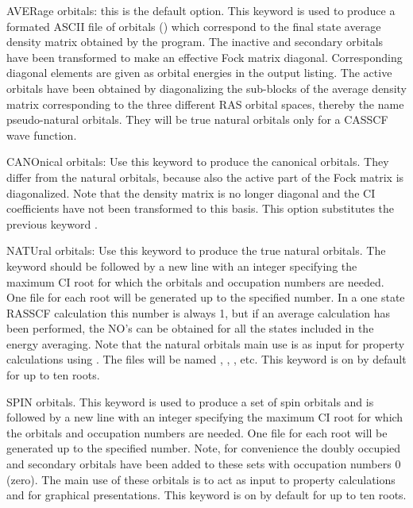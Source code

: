 \begin{keywordlist}
AVERage orbitals: this is the default option.
This keyword is used to produce a formated ASCII file of orbitals
() which correspond to the final state average density matrix obtained by
the  program. The inactive and
secondary orbitals have been transformed to make an effective Fock
matrix diagonal. Corresponding diagonal elements are given as orbital
energies in the  output listing. The active orbitals have been
obtained by diagonalizing the sub-{}blocks of the average density matrix
corresponding to the three different RAS orbital spaces, thereby
the name pseudo-{}natural orbitals. They will be true natural orbitals
only for a CASSCF wave function.

CANOnical orbitals:
Use this keyword to produce the canonical orbitals. They differ from
the natural orbitals, because also the active part of the Fock matrix is
diagonalized. Note that the density matrix is no longer diagonal and
the CI coefficients have not been transformed to this basis.
This option substitutes the previous keyword .

NATUral orbitals:
Use this keyword to produce the true natural orbitals. The keyword
should be followed by a new line with an integer specifying the maximum
CI root for which the orbitals and occupation numbers are needed.
One file for each root will be generated up to the specified number.
In a one state RASSCF calculation this number is always 1, but if an average
calculation has been performed, the NO's can be obtained for all the states
included in the energy averaging. Note that the natural orbitals main
use is as input for property calculations using .
The files will be named , , , etc.
This keyword is on by default for up to ten roots.

SPIN orbitals.
This keyword is used to produce a set of spin orbitals and is
followed by a new line with an integer specifying the maximum CI root
for which the orbitals
and occupation numbers are needed. One file for each root will be
generated up to the specified number. Note, for convenience the
doubly occupied and secondary orbitals have been added to these
sets with occupation numbers 0 (zero). The main use of these orbitals
is to act as input to property calculations and for graphical
presentations.
This keyword is on by default for up to ten roots.


\end{keywordlist}
